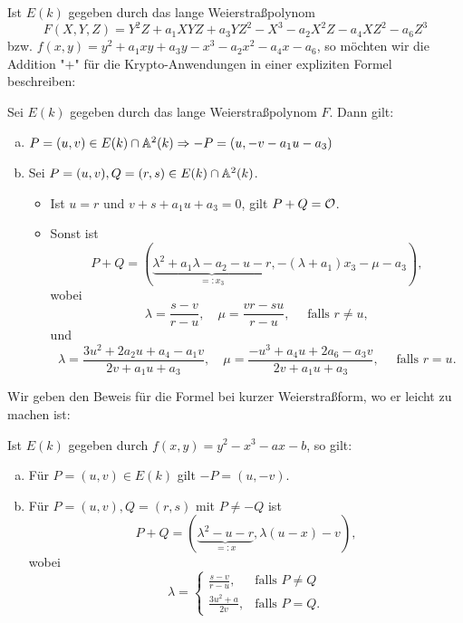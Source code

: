 Ist $E(k)$ gegeben durch das lange Weierstraßpolynom
\[ F(X,Y,Z) = Y^2Z + a_1 XYZ + a_3 YZ^2 - X^3 - a_2X^2Z - a_4 XZ^2 - a_6 Z^3 \]
bzw. $f(x,y) = y^2 + a_1xy + a_3y - x^3 - a_2x^2 - a_4x - a_6$, so möchten wir die Addition "$+$" für die Krypto-Anwendungen in einer expliziten Formel beschreiben:

\begin{satz}
\label{satz_13.13}
	Sei $E(k)$ gegeben durch das lange Weierstraßpolynom $F$. 
	Dann gilt: 
	\begin{enumerate}[(a)]
		\item $P = (u,v) \in E(k) \cap \mathbb{A}^2(k) \Rightarrow -P = (u,-v-a_1u-a_3)$
		\item Sei $P = (u,v), Q = (r,s) \in E(k) \cap \mathbb{A}^2(k)$. 
		\begin{itemize}
			\item Ist $u = r$ und $v + s + a_1 u + a_3 = 0$, gilt $P + Q = \mathcal{O}$.
			\item Sonst ist 
			\[ P + Q = (\underbrace{\lambda^2 + a_1 \lambda - a_2 - u - r}_{=:x_3}, -(\lambda + a_1) x_3 - \mu - a_3), \] wobei
			\[ \lambda = \frac{s-v}{r-u}, \quad \mu = \frac{vr - su}{r-u}, \quad \text{ falls } r \neq u, \]
			und
			\[ \lambda = \frac{3u^2 + 2a_2 u +a_4 - a_1 v}{2v + a_1u + a_3}, \quad  \mu = \frac{-u^3 + a_4 u + 2a_6 - a_3v}{2v + a_1u + a_3}, \quad \text{ falls } r = u. \]
		\end{itemize}
	\end{enumerate}
\end{satz}

Wir geben den Beweis für die Formel bei kurzer Weierstraßform, wo er leicht zu machen ist:
\begin{satz}
\label{satz_13.14}
	Ist $E(k)$ gegeben durch $f(x,y) = y^2 - x^3 - ax - b$, so gilt:
	\begin{enumerate}[(a)]
		\item Für $P = (u,v) \in E(k)$ gilt $-P = (u,-v)$.
		\item Für $P = (u,v), Q = (r,s)$ mit $P \neq -Q$ ist
		\[ P + Q = (\underbrace{\lambda^2 - u - r}_{=:x}, \lambda(u-x) - v), \]
		wobei
		\[ \lambda = \begin{cases}
			\frac{s-v}{r-u}, & \text{falls } P \neq Q \\
			\frac{3u^2+a}{2v}, & \text{falls } P = Q.
		\end{cases} \]
	\end{enumerate}
\end{satz}

